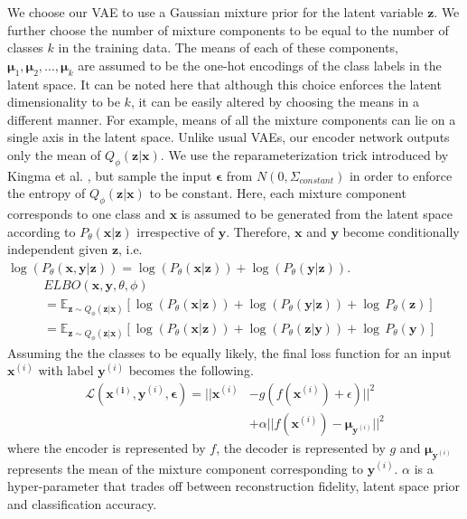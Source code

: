 \documentclass[letterpaper]{article} %
\begin{document}
We choose our VAE to use a Gaussian mixture prior for the latent variable $\mathbf{z}$. We further choose the number of mixture components to be equal to the number of classes $k$ in the training data. The means of each of these components, $\boldsymbol{\mu}_{1},\boldsymbol{\mu}_{2},...,\boldsymbol{\mu}_{k}$ are assumed to be the one-hot encodings of the class labels in the latent space. It can be noted here that although this choice enforces the latent dimensionality to be $k$, it can be easily altered by choosing the means in a different manner. For example, means of all the mixture components can lie on a single axis in the latent space. Unlike usual VAEs, our encoder network outputs only the mean of $Q_\phi(\mathbf{z}|\mathbf{x})$. We use the reparameterization trick introduced by Kingma et al. , but sample the input $\boldsymbol{\epsilon}$ from $N(0,\Sigma_{constant})$ in order to enforce the entropy of $Q_\phi(\mathbf{z}|\mathbf{x})$ to be constant. Here, each mixture component corresponds to one class and $\mathbf{x}$ is assumed to be generated from the latent space according to $P_{\theta}(\mathbf{x}|\mathbf{z})$ irrespective of $\mathbf{y}$. Therefore, $\mathbf{x}$ and $\mathbf{y}$ become conditionally independent given $\mathbf{z}$, i.e. $\log(P_{\theta}(\mathbf{x},\mathbf{y}|\mathbf{z})) = \log(P_{\theta}(\mathbf{x}|\mathbf{z})) + \log(P_{\theta}(\mathbf{y}|\mathbf{z}))$.
\begin{equation}
\begin{split}
&ELBO(\mathbf{x},\mathbf{y},\theta,\phi) \\ &= \mathbb{E}_{\mathbf{z}\sim Q_{\phi}(\mathbf{z}|\mathbf{x})} \left[\log(P_{\theta}(\mathbf{x}|\mathbf{z})) + \log(P_{\theta}(\mathbf{y}|\mathbf{z})) + \log \, P_{\theta}(\mathbf{z}) \right] \\
&= \mathbb{E}_{\mathbf{z}\sim Q_{\phi}(\mathbf{z}|\mathbf{x})} \left[\log(P_{\theta}(\mathbf{x}|\mathbf{z})) + \log(P_{\theta}(\mathbf{z}|\mathbf{y})) + \log \, P_{\theta}(\mathbf{y}) \right]
\end{split}
\label{elbo_with_y}
\end{equation}
Assuming the the classes to be equally likely, the final loss function for an input $\mathbf{x}^{(i)}$ with label $\mathbf{y}^{(i)}$ becomes the following.
\begin{equation}
\begin{split}
\mathcal{L}(\mathbf{x^{(i)}}, \mathbf{y}^{(i)}, \boldsymbol{\epsilon}) = ||\mathbf{x}^{(i)} &- g(f(\mathbf{x}^{(i)})+\epsilon) ||^2 \\
&+ \alpha|| f(\mathbf{x}^{(i)}) - \boldsymbol{\mu}_{\mathbf{y}^{(i)}} ||^2 %
\end{split}
\label{final_loss}
\end{equation}
where the encoder is represented by $f$, the decoder is represented by $g$ and $\boldsymbol{\mu}_{\mathbf{y}^{(i)}}$ represents the mean of the mixture component corresponding to $\mathbf{y}^{(i)}$. $\alpha$ is a hyper-parameter that trades off between reconstruction fidelity, latent space prior and classification accuracy.
\end{document}
